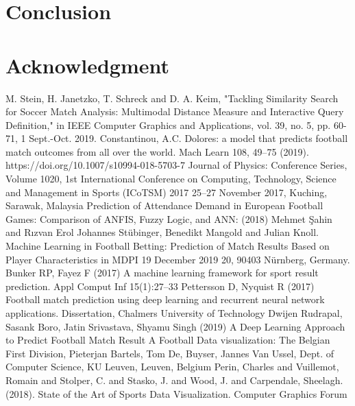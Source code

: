 \documentclass[journal]{IEEEtran}
\begin{document}





\section{Conclusion}







\appendices

\section{}



\section*{Acknowledgment}



\ifCLASSOPTIONcaptionsoff
  \newpage
\fi


\begin{thebibliography}{1}

 M. Stein, H. Janetzko, T. Schreck and D. A. Keim, "Tackling Similarity Search for Soccer Match Analysis: Multimodal Distance Measure and Interactive Query Definition," in IEEE Computer Graphics and Applications, vol. 39, no. 5, pp. 60-71, 1 Sept.-Oct. 2019.%
 Constantinou, A.C. Dolores: a model that predicts football match outcomes from all over the world. Mach Learn 108, 49–75 (2019). https://doi.org/10.1007/s10994-018-5703-7
  Journal of Physics: Conference Series, Volume 1020, 1st International Conference on Computing, Technology, Science and Management in Sports (ICoTSM) 2017 25–27 November 2017, Kuching, Sarawak, Malaysia
 Prediction of Attendance Demand in European Football Games: Comparison of ANFIS, Fuzzy Logic, and ANN: (2018) Mehmet Şahin and Rızvan Erol 
 Johannes Stübinger, Benedikt Mangold and Julian Knoll. Machine Learning in Football Betting: Prediction of Match Results Based on Player Characteristics in MDPI  19 December 2019 20, 90403 Nürnberg, Germany.
 Bunker RP, Fayez F (2017) A machine learning framework for sport result prediction. Appl Comput Inf 15(1):27–33
 Pettersson D, Nyquist R (2017) Football match prediction using deep learning and recurrent neural network applications. Dissertation, Chalmers University of Technology
 Dwijen Rudrapal, Sasank Boro, Jatin Srivastava, Shyamu Singh (2019) A Deep Learning Approach to Predict Football Match Result
 A Football Data visualization: The Belgian First Division, Pieterjan Bartels, Tom De, Buyser, Jannes Van Ussel, Dept. of Computer Science, KU Leuven, Leuven, Belgium
 Perin, Charles and Vuillemot, Romain and Stolper, C. and Stasko, J. and Wood, J. and Carpendale, Sheelagh. (2018). State of the Art of Sports Data Visualization. Computer Graphics Forum


\end{thebibliography}
\end{document}
